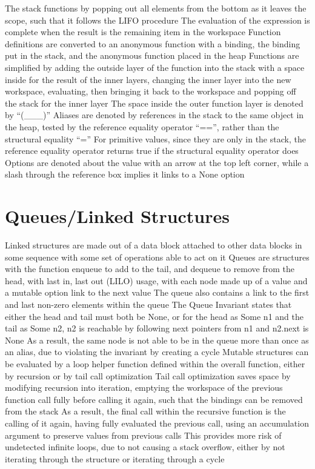 \documentclass[11 pt, twoside]{article}
\newenvironment{outline*}
{
	\begin{outline}[enumerate]
	}
	{\end{outline}
}
\begin{document}
\begin{outline*}
		\3 The stack functions by popping out all elements from the bottom as it leaves the scope, such that it follows the LIFO procedure
		\3 The evaluation of the expression is complete when the result is the remaining item in the workspace
		\3 Function definitions are converted to an anonymous function with a binding, the binding put in the stack, and the anonymous function placed in the heap
	\2 Functions are simplified by adding the outside layer of the function into the stack with a space inside for the result of the inner layers, changing the inner layer into the new workspace, evaluating, then bringing it back to the workspace and popping off the stack for the inner layer
		\3 The space inside the outer function layer is denoted by ``(\_\_\_)''
	\2 Aliases are denoted by references in the stack to the same object in the heap, tested by the reference equality operator ``=='', rather than the structural equality ``=''
		\3 For primitive values, since they are only in the stack, the reference equality operator returns true if the structural equality operator does
\1 Options are denoted about the value with an arrow at the top left corner, while a slash through the reference box implies it links to a None option
\end{outline*}
\section{Queues/Linked Structures}
\begin{outline*}
\1 Linked structures are made out of a data block attached to other data blocks in some sequence with some set of operations able to act on it
	\2 Queues are structures with the function enqueue to add to the tail, and dequeue to remove from the head, with last in, last out (LILO) usage, with each node made up of a value and a mutable option link to the next value
	\2 The queue also contains a link to the first and last non-zero elements within the queue
\1 The Queue Invariant states that either the head and tail must both be None, or for the head as Some n1 and the tail as Some n2, n2 is reachable by following next pointers from n1 and n2.next is None
	\2 As a result, the same node is not able to be in the queue more than once as an alias, due to violating the invariant by creating a cycle
\1 Mutable structures can be evaluated by a loop helper function defined within the overall function, either by recursion or by tail call optimization
	\2 Tail call optimization saves space by modifying recursion into iteration, emptying the workspace of the previous function call fully before calling it again, such that the bindings can be removed from the stack
		\3 As a result, the final call within the recursive function is the calling of it again, having fully evaluated the previous call, using an accumulation argument to preserve values from previous calls
	\2 This provides more risk of undetected infinite loops, due to not causing a stack overflow, either by not iterating through the structure or iterating through a cycle
\end{outline*}
\end{document}

